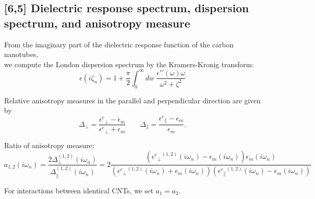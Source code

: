 \documentclass[a4paper]{article}
\begin{document}
\subsection{[6,5] Dielectric response spectrum, dispersion spectrum, and anisotropy measure}
\begin{center}
    From the imaginary part of the dielectric response function of the carbon
nanotubes, \\we compute the London dispersion spectrum by the Kramers-Kronig
transform:
\begin{equation}
\epsilon(i \zeta_n) = 1 + \frac{\pi}{2} \int_0^{\infty} dw
~\frac{\epsilon\prime\prime(\omega)\omega}{\omega^{2} + \zeta^{2}}
\end{equation}

Relative anisotropy measures in the parallel and perpendicular direction are given by
\begin{equation}
\Delta_{\perp}=\frac{{\epsilon^{c}}_{\perp}-\epsilon_{m}}{{\epsilon^{c}}_{\perp}+\epsilon_{m}}\qquad\Delta_{\parallel}=\frac{{\epsilon^{c}}_{\parallel}-\epsilon_{m}}{\epsilon_{m}}.
\label{anisoind}
\end{equation}

Ratio of anisotropy measure:
\begin{equation}
a_{1,2}(i \omega_n) = \frac{2 \Delta_{\perp}^{(1,2)}(i\omega_n)}{\Delta_{\parallel}^{(1,2)}(i \omega_n)} = 
2 \frac{({{\epsilon^{c}}_{\perp}}^{(1,2)}(i \omega_n) -\epsilon_{m}(i \omega_n)) \epsilon_{m}(i \omega_n)}{({{\epsilon^{c}}_{\perp}}^{(1,2)}(i \omega_n)+\epsilon_{m}(i \omega_n)) ({{\epsilon^{c}}_{\parallel}}^{(1,2)}(i \omega_n) -\epsilon_{m}(i \omega_n))}
\label{eq:adef}
\end{equation}

For interactions between identical CNTs, we set $a_{1}=a_{2}$.  


\end{center}
\end{document}

